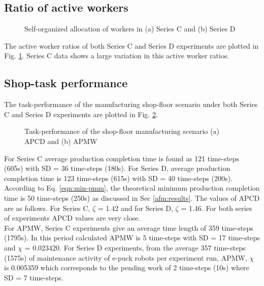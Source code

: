 \subsection*{Ratio of active workers}
\begin{figure}
\centering
\hspace*{0.5cm}
\newline
{}
\caption{\small Self-organized allocation of workers in (a) Series C and (b) Series D}
\label{fig:plasticity-SC-SD} 
\end{figure}
%
The active worker ratios of both Series C and Series D experiments are plotted in Fig. \ref{fig:plasticity-SC-SD}. Series C data shows a large variation in this active worker ratios.
\subsection*{Shop-task performance}
The task-performance of the manufacturing shop-floor scenario under both Series C and Series D experiments are plotted in Fig. \ref{fig:vms-SC-SD}. 
\begin{figure}
\centering
\hspace*{0.5cm}
\newline
{}
\caption{\small Task-performance of the shop-floor manufacturing scenario (a) APCD and (b) APMW}
\label{fig:vms-SC-SD} 
\end{figure}
For Series C  average production completion time is found as 121 time-steps (605s) with SD = 36 time-steps (180s). For Series D,  average production completion time is 123 time-steps (615s) with SD = 40 time-steps (200s). According to Eq. \ref{eqn:min-pmm}, the theoretical minimum production completion time is 50 time-steps (250s) as discussed in Sec \ref{afm:results}.  The values of APCD are as follows. For Series C, $\zeta$ = 1.42 and for Series D, $\zeta$ = 1.46. For both series of experiments APCD values are very close.\\
For APMW, Series C experiments give an average time length of 359 time-steps (1795s). In this period  calculated APMW is 5 time-steps with SD = 17 time-steps and $\chi$ = 0.023420. For Series D experiments, from the average 357 time-steps (1575s) of maintenance activity of e-puck robots per experiment run, APMW, $\chi$ is 0.005359 which corresponds to the pending work of 2 time-steps (10s) where SD = 7 time-steps.
